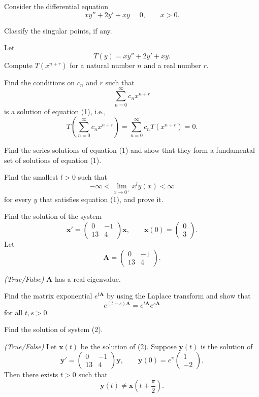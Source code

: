\documentclass[11pt,oneside]{article}
\begin{document}
\begin{problem}
Consider the differential equation
\[
xy''+2y'+xy=0,
\qquad x>0. \tag{1}
\]
\begin{problemsubparts}
\item Classify the singular points, if any.
\item Let
\[
T(y)=xy''+2y'+xy.
\]
Compute $T(x^{n+r})$ for a natural number $n$ and a real number $r$.
\item Find the conditions on $c_n$ and $r$ such that
\[
\sum_{n=0}^{\infty}c_nx^{n+r}
\]
is a solution of equation (1), i.e.,
\[
T\left(\sum_{n=0}^{\infty}c_nx^{n+r}\right)
=\sum_{n=0}^{\infty}c_nT(x^{n+r})=0.
\]
\item Find the series solutions of equation (1) and show that they form a fundamental set of solutions of equation (1).
\item Find the smallest $l>0$ such that
\[
-\infty<\lim_{x\to0^+}x^ly(x)<\infty
\]
for every $y$ that satisfies equation (1), and prove it.
\end{problemsubparts}
\end{problem}

\begin{problem}
Find the solution of the system
\[
\mathbf x'=
\begin{pmatrix}
0&-1\\
13&4
\end{pmatrix}\mathbf x,
\qquad
\mathbf x(0)=
\begin{pmatrix}
0\\
3
\end{pmatrix}. \tag{2}
\]
Let
\[
\mathbf A=
\begin{pmatrix}
0&-1\\
13&4
\end{pmatrix}.
\]
\begin{problemsubparts}
\item \textit{(True/False)} $\mathbf A$ has a real eigenvalue.
\item Find the matrix exponential $e^{t\mathbf A}$ by using the Laplace transform and show that
\[
e^{(t+s)\mathbf A}=e^{t\mathbf A}e^{s\mathbf A}
\]
for all $t,s>0$.
\item Find the solution of system (2).
\item \textit{(True/False)} Let $\mathbf x(t)$ be the solution of (2). Suppose $\mathbf y(t)$ is the solution of
\[
\mathbf y'=
\begin{pmatrix}
0&-1\\
13&4
\end{pmatrix}\mathbf y,
\qquad
\mathbf y(0)=e^{\pi}
\begin{pmatrix}
1\\
-2
\end{pmatrix}.
\]
Then there exists $t>0$ such that
\[
\mathbf y(t)\ne\mathbf x\left(t+\frac{\pi}{2}\right).
\]
\end{problemsubparts}
\end{problem}
\end{document}
